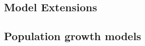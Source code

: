 \documentclass[12pt,english]{article}
\begin{document}
\begin{spacing}{1.9}
\begin{flushleft}





\section*{Model Extensions}
\label{sec:ext}

\subsection*{Population growth models}



\end{flushleft}
\end{spacing}
\end{document}
